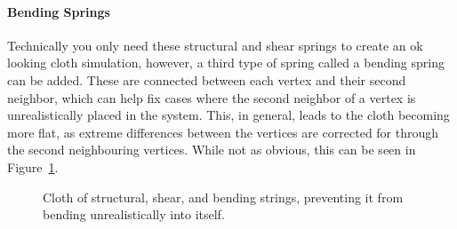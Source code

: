 \paragraph{Bending Springs}
Technically you only need these structural and shear springs to create an ok looking cloth simulation,
however, a third type of spring called a bending spring can be added.
These are connected between each vertex and their second neighbor,
which can help fix cases where the second neighbor of a vertex is unrealistically placed in the system.
This, in general, leads to the cloth becoming more flat, as extreme differences between the vertices are corrected for
through the second neighbouring vertices\cite{jeff_lander_real_time_cloth}.
While not as obvious, this can be seen in Figure~\ref{fig:bending_springs_collapsing}.
\begin{figure}[H]
    \centering
    \caption{Cloth of structural, shear, and bending strings, preventing it from bending unrealistically into itself.}
    \label{fig:bending_springs_collapsing}
\end{figure}

%

